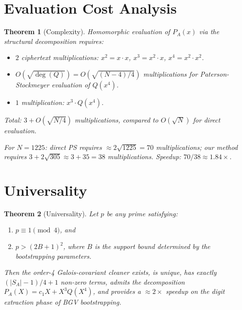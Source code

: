 \documentclass[11pt]{article}
\newtheorem{theorem}{Theorem}
\begin{document}
\section{Evaluation Cost Analysis}

\begin{theorem}[Complexity]\label{thm:complexity}
Homomorphic evaluation of $P_A(x)$ via the structural decomposition requires:
\begin{itemize}
\item $2$ ciphertext multiplications: $x^2 = x \cdot x$, $x^3 = x^2 \cdot x$, $x^4 = x^2 \cdot x^2$.
\item $O(\sqrt{\deg(Q)}) = O(\sqrt{(N-4)/4})$ multiplications for Paterson-Stockmeyer evaluation of $Q(x^4)$.
\item $1$ multiplication: $x^3 \cdot Q(x^4)$.
\end{itemize}
Total: $3 + O(\sqrt{N/4})$ multiplications, compared to $O(\sqrt{N})$ for direct evaluation.

For $N = 1225$: direct PS requires $\approx 2\sqrt{1225} = 70$ multiplications; our method requires $3 + 2\sqrt{305} \approx 3 + 35 = 38$ multiplications. Speedup: $70/38 \approx 1.84\times$.
\end{theorem}

\section{Universality}

\begin{theorem}[Universality]\label{thm:universal}
Let $p$ be any prime satisfying:
\begin{enumerate}[label=(\alph*)]
\item $p \equiv 1 \pmod{4}$, and
\item $p > (2B+1)^2$, where $B$ is the support bound determined by the bootstrapping parameters.
\end{enumerate}
Then the order-4 Galois-covariant cleaner exists, is unique, has exactly $(|S_A|-1)/4 + 1$ non-zero terms, admits the decomposition $P_A(X) = c_1 X + X^3 Q(X^4)$, and provides a $\approx 2\times$ speedup on the digit extraction phase of BGV bootstrapping.
\end{theorem}
\end{document}
